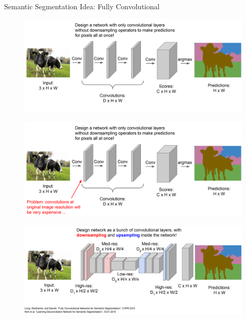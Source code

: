 \documentclass[10pt]{beamer}
\theoremstyle{remark}
\theoremstyle{definition}
\begin{document}
\begin{frame}[allowframebreaks]{Semantic Segmentation Idea: Fully Convolutional}
\begin{figure}
\centering
\includegraphics[width=1.0\textwidth,height=1.0\textheight,keepaspectratio]{./images/sem_7.png}
\end{figure}

\framebreak

\begin{figure}
\centering
\includegraphics[width=1.0\textwidth,height=1.0\textheight,keepaspectratio]{./images/sem_8.png}
\end{figure}

\framebreak

\begin{figure}
\centering
\includegraphics[width=1.0\textwidth,height=1.0\textheight,keepaspectratio]{./images/sem_9.png}
\end{figure}


\end{frame}
\end{document}
